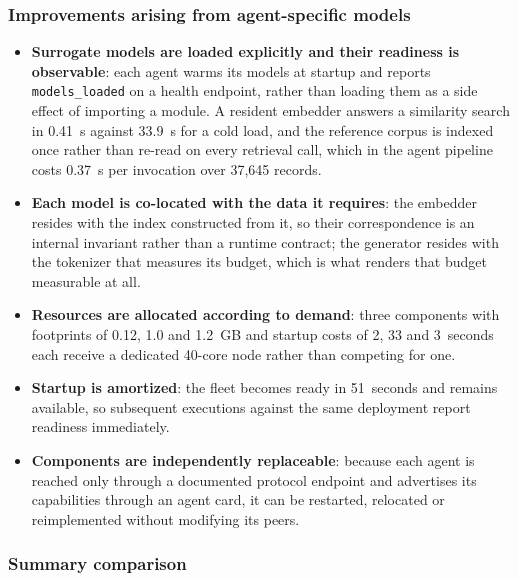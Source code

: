\subsubsection{Improvements arising from agent-specific models}

\begin{itemize}
    \item \textbf{Surrogate models are loaded explicitly and their readiness is
    observable}: each agent warms its models at startup and reports \texttt{models\_loaded}
    on a health endpoint, rather than loading them as a side effect of importing a module.
    A resident embedder answers a similarity search in 0.41~s against 33.9~s for a cold
    load, and the reference corpus is indexed once rather than re-read on every retrieval
    call, which in the agent pipeline costs 0.37~s per invocation over 37{,}645 records.

    \item \textbf{Each model is co-located with the data it requires}: the embedder resides with
    the index constructed from it, so their correspondence is an internal invariant rather than
    a runtime contract; the generator resides with the tokenizer that measures its budget, which
    is what renders that budget measurable at all.

    \item \textbf{Resources are allocated according to demand}: three components with footprints
    of 0.12, 1.0 and 1.2~GB and startup costs of 2, 33 and 3~seconds each receive a dedicated
    40-core node rather than competing for one.

    \item \textbf{Startup is amortized}: the fleet becomes ready in 51~seconds and remains
    available, so subsequent executions against the same deployment report readiness
    immediately.

    \item \textbf{Components are independently replaceable}: because each agent is reached only
    through a documented protocol endpoint and advertises its capabilities through an agent
    card, it can be restarted, relocated or reimplemented without modifying its peers.
\end{itemize}

\subsubsection{Summary comparison}

